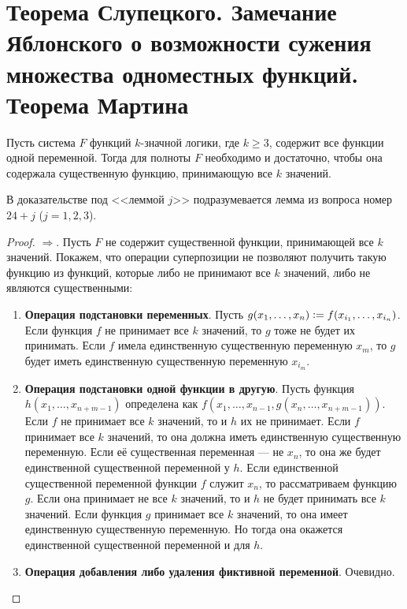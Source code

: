 \section{Теорема Слупецкого. Замечание Яблонского о возможности сужения множества одноместных функций. Теорема Мартина}

\begin{theorem}[Слупецкий]
    Пусть система $F$ функций $k$-значной логики, где $k \geqslant 3$, содержит все функции одной переменной. Тогда для полноты $F$ необходимо и достаточно, чтобы она содержала существенную функцию, принимающую все $k$ значений.
\end{theorem}

В доказательстве под <<леммой $j$>> подразумевается лемма из вопроса номер $24 + j$ ($j = 1, 2, 3$).

\begin{proof}
    $\Rightarrow$. Пусть $F$ не содержит существенной функции, принимающей все $k$ значений. Покажем, что операции суперпозиции не позволяют получить такую функцию из функций, которые либо не принимают все $k$ значений, либо не являются существенными:
    \begin{enumerate}
        \item \textbf{Операция подстановки переменных}. Пусть $g(x_1, \ldots, x_n) \vcentcolon = f(x_{i_1}, \ldots, x_{i_n})$. Если функция $f$ не принимает все $k$ значений, то $g$ тоже не будет их принимать. Если $f$ имела единственную существенную переменную $x_m$, то $g$ будет иметь единственную существенную переменную $x_{i_m}$.
        \item \textbf{Операция подстановки одной функции в другую}. Пусть функция $h(x_1, \ldots, x_{n + m - 1})$ определена как $f(x_1, \ldots, x_{n - 1}, g(x_n, \ldots, x_{n + m - 1}))$. Если $f$ не принимает все $k$ значений, то и $h$ их не принимает. Если $f$ принимает все $k$ значений, то она должна иметь единственную существенную переменную. Если её существенная переменная --- не $x_n$, то она же будет единственной существенной переменной у $h$. Если единственной существенной переменной функции $f$ служит $x_n$, то рассматриваем функцию $g$. Если она принимает не все $k$ значений, то и $h$ не будет принимать все $k$ значений. Если функция $g$ принимает все $k$ значений, то она имеет единственную существенную переменную. Но тогда она окажется единственной существенной переменной и для $h$.
        \item \textbf{Операция добавления либо удаления фиктивной переменной}. Очевидно.
    \end{enumerate}


\end{proof}
